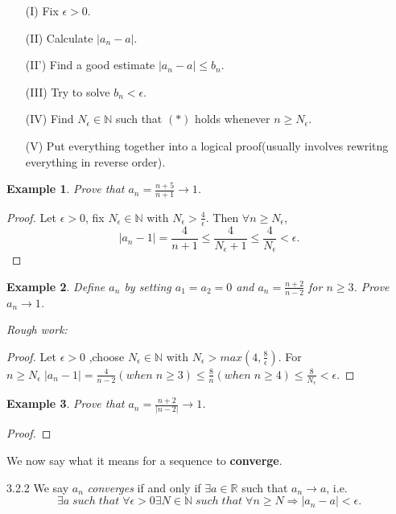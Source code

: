 \documentclass[a4paper]{article}
\def\rr{{\mathbb R}}
\def\nn{{\mathbb N}}
\newtheorem{example}{Example}[subsection]
\begin{document}
\begin{enumerate}
    \item[(I)] Fix $\epsilon>0$.
    \item[(II)] Calculate $|a_n-a|$. 
    \item[(II')] Find a good estimate $|a_n-a|\leq b_n$.
    \item[(III)] Try to solve $b_n<\epsilon$.
    \item[(IV)] Find $N_\epsilon \in \nn$ such that $(*)$ holds whenever $n\geq N_\epsilon$.
    \item[(V)] Put everything together into a logical proof(usually involves rewritng everything in reverse order).     
\end{enumerate}
\begin{example}
    Prove that $a_n=\frac{n+5}{n+1}\rightarrow 1$.
\end{example}
\begin{proof}
    Let $\epsilon >0$, fix $N_\epsilon \in \nn $ with $N_\epsilon >\frac{4}{\epsilon}$. Then $\forall n \geq N_\epsilon$,
    \begin{equation*}
        |a_n-1|=\frac{4}{n+1}\leq\frac{4}{N_\epsilon+1}\leq\frac{4}{N_\epsilon}<\epsilon.
    \end{equation*} 
\end{proof}
\begin{example}
    Define $a_n$ by setting $a_1=a_2=0$ and $a_n=\frac{n+2}{n-2} $ for $n\geq 3$. Prove $a_n\rightarrow 1$.
\end{example}
\textit{Rough work:}
\begin{proof}
    Let $\epsilon >0$ ,choose $N_\epsilon \in \nn $ with $N_\epsilon>max(4,\frac{8}{\epsilon})$.
    For $n\geq N_\epsilon \;|a_n-1|=\frac{4}{n-2}(when \; n\geq 3)\leq\frac{8}{n}(when \; n\geq 4)\leq\frac{8}{N_\epsilon}<\epsilon$.
\end{proof}
\begin{example}
    Prove that $a_n=\frac{n+2}{|n-2|}\rightarrow 1$. 
\end{example}
\begin{proof}
\end{proof}
We now say what it means for a sequence to \textsf{\textbf{converge}}.
\begin{definition}{3.2.2}{}
    We say $a_n$ \textit{converges} if and only if $\exists a \in \rr$ such that $a_n \rightarrow a$, i.e.
    \begin{equation*}
            \exists a \;such \; that \;\forall \epsilon >0 \exists N \in \nn \; such \; that \; \forall n\geq N\Longrightarrow  |a_n-a|<\epsilon.
    \end{equation*}
\end{definition}
\end{document}
